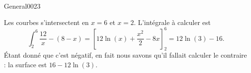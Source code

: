 \begin{corrige}{General0023}

Les courbes s'intersectent en $x=6$ et $x=2$. L'intégrale à calculer est
\begin{equation}
	\int_2^6\frac{ 12 }{ x }-(8-x)=\left[ 12\ln(x)+\frac{ x^2 }{ 2 }-8x \right]_2^6=12\ln(3)-16.
\end{equation}
Étant donné que c'est négatif, en fait nous savons qu'il fallait calculer le contraire : la surface est $16-12\ln(3)$.

\end{corrige}
